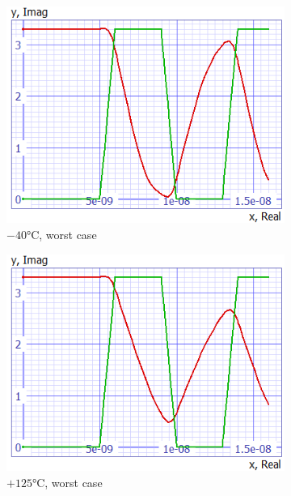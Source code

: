 \documentclass[../main.tex]{subfiles}
\begin{document}
{		\begin{figure}[H]
			\centering
			\begin{subfigure}{0.35\textwidth}
				\centering
				\includegraphics[width=\textwidth]{plots/Q8_ws_40.png}
				\caption{$-40$°C, worst case}
				\label{fig:subfig1}
			\end{subfigure}
			\begin{subfigure}{0.35\textwidth}
				\centering
				\includegraphics[width=\textwidth]{plots/Q8_ws_125.png}
				\caption{$+125$°C, worst case}
				\label{fig:subfig2}
			\end{subfigure}
			\begin{subfigure}{0.3\textwidth}

\end{subfigure}
\end{figure}}
\end{document}
